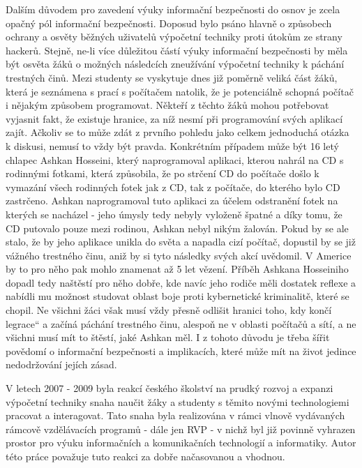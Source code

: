 \documentclass[a4paper, 12pt]{article}
\providecommand{\uv}[1]{\quotedblbase #1\textquotedblleft}
\begin{document}
Dalším důvodem pro zavedení výuky informační bezpečnosti do osnov je zcela opačný pól informační bezpečnosti. Doposud bylo psáno hlavně o způsobech ochrany a osvěty běžných uživatelů výpočetní techniky proti útokům ze strany hackerů. Stejně, ne-li více důležitou částí výuky informační bezpečnosti by měla být osvěta žáků o možných následcích zneužívání výpočetní techniky k páchání trestných činů. Mezi studenty se vyskytuje dnes již poměrně veliká část žáků, která je seznámena s prací s počítačem natolik, že je potenciálně schopná počítač i nějakým způsobem programovat. Někteří z těchto žáků mohou potřebovat vyjasnit fakt, že existuje hranice, za níž nesmí při programování svých aplikací zajít. Ačkoliv se to může zdát z prvního pohledu jako celkem jednoduchá otázka k diskusi, nemusí to vždy být pravda. Konkrétním případem může být 16 letý chlapec Ashkan Hosseini, který naprogramoval aplikaci, kterou nahrál na CD s rodinnými fotkami, která způsobila, že po strčení CD do počítače došlo k vymazání všech rodinných fotek jak z CD, tak z počítače, do kterého bylo CD zastrčeno. Ashkan naprogramoval tuto aplikaci za účelem odstranění fotek na kterých se nacházel \-- jeho úmysly tedy nebyly vyloženě špatné a díky tomu, že CD putovalo pouze mezi rodinou, Ashkan nebyl nikým žalován. Pokud by se ale stalo, že by jeho aplikace unikla do světa a napadla cizí počítač, dopustil by se již vážného trestného činu, aniž by si tyto následky svých akcí uvědomil. V Americe by to pro něho pak mohlo znamenat až 5 let vězení. Příběh Ashkana Hosseiniho dopadl tedy naštěstí pro něho dobře, kde navíc jeho rodiče měli dostatek reflexe a nabídli mu možnost studovat oblast boje proti kybernetické kriminalitě, které se chopil. Ne všichni žáci však musí vždy přesně odlišit hranici toho, kdy končí \uv{legrace} a začíná páchání trestného činu, alespoň ne v oblasti počítačů a sítí, a ne všichni musí mít to štěstí, jaké Ashkan měl. I z tohoto důvodu je třeba šířit povědomí o informační bezpečnosti a implikacích, které může mít na život jedince nedodržování jejích zásad. 

V letech 2007 \-- 2009 byla reakcí českého školství na prudký rozvoj a expanzi výpočetní techniky snaha naučit žáky a studenty s těmito novými technologiemi pracovat a interagovat. Tato snaha byla realizována v rámci vlnově vydávaných rámcově vzdělávacích programů \-- dále jen RVP \-- v nichž byl již povinně vyhrazen prostor pro výuku informačních a komunikačních technologií a informatiky. Autor této práce považuje tuto reakci za dobře načasovanou a vhodnou. 
\end{document}
